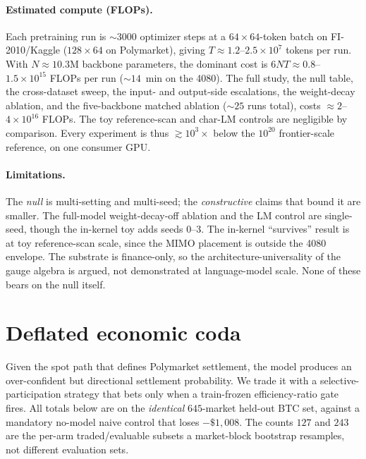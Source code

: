 \documentclass{article}
\begin{document}
\paragraph{Estimated compute (FLOPs).}
Each pretraining run is ${\sim}3000$ optimizer steps at a $64{\times}64$-token
batch on FI-2010/Kaggle ($128{\times}64$ on Polymarket), giving
$T\approx1.2$--$2.5\times10^7$ tokens per run. With $N\approx10.3$M backbone
parameters, the dominant cost is $6NT\approx0.8$--$1.5\times10^{15}$ FLOPs per
run (${\sim}14$~min on the 4080). The full study, the null table, the
cross-dataset sweep, the input- and output-side escalations, the weight-decay
ablation, and the five-backbone matched ablation (${\sim}25$ runs total), costs
${\approx}2$--$4\times10^{16}$ FLOPs. The toy reference-scan and char-LM
controls are negligible by comparison. Every experiment is thus
$\gtrsim10^{3}\times$ below the $10^{20}$ frontier-scale reference, on one
consumer GPU.

\paragraph{Limitations.}
The \emph{null} is multi-setting and multi-seed; the \emph{constructive} claims
that bound it are smaller. The full-model
weight-decay-off ablation and the LM control are single-seed, though the in-kernel
toy adds seeds 0--3. The in-kernel ``survives'' result is at toy reference-scan
scale, since the MIMO placement is outside the 4080 envelope. The substrate is
finance-only, so the architecture-universality of the gauge algebra is argued, not
demonstrated at language-model scale. None of these bears on the null itself.

\section{Deflated economic coda}\label{app:coda}

Given the spot path that defines Polymarket settlement, the model produces an
over-confident but directional settlement probability. We trade it with a
selective-participation strategy that bets only when a train-frozen efficiency-ratio
gate fires. All totals below are on the \emph{identical} $645$-market held-out BTC
set, against a mandatory no-model naive control that loses $-\$1{,}008$. The counts
$127$ and $243$ are the per-arm traded/evaluable subsets a market-block bootstrap
resamples, not different evaluation sets.
\end{document}
